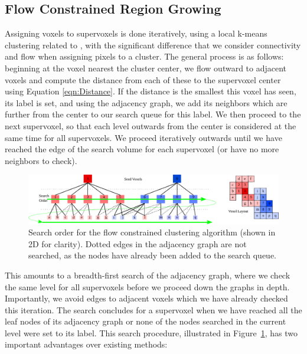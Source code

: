 \subsection{Flow Constrained Region Growing}
\label{subsec:FlowClustering}
Assigning voxels to supervoxels is done iteratively, using a local k-means clustering related to \cite{SLICCompared,DASP}, with the significant difference that we consider connectivity and flow when assigning pixels to a cluster. The general process is as follows: beginning at the voxel nearest the cluster center, we flow outward to adjacent voxels and compute the distance from each of these to the supervoxel center using Equation \ref{eqn:Distance}. If the distance is the smallest this voxel has seen, its label is set, and using the adjacency graph, we add its neighbors which are further from the center to our search queue for this label. We then proceed to the next supervoxel, so that each level outwards from the center is considered at the same time for all supervoxels. We proceed iteratively outwards until we have reached the edge of the search volume for each supervoxel (or have no more neighbors to check).

\begin{figure}[!t]
\begin{center}
   \includegraphics[width=0.95\linewidth]{figures/CVPR2013/SearchOrder.pdf}
\end{center}
   \caption[Voxel Search Order]{Search order for the flow constrained clustering algorithm (shown in 2D for clarity). Dotted edges in the adjacency graph are not searched, as the nodes have already been added to the search queue.}
\label{fig:ClusterSearch}
\end{figure}

This amounts to a breadth-first search of the adjacency graph, where we check the same level for all supervoxels before we proceed down the graphs in depth. Importantly, we avoid edges to adjacent voxels which we have already checked this iteration. The search concludes for a supervoxel when we have reached all the leaf nodes of its adjacency graph or none of the nodes searched in the current level were set to its label. This search procedure, illustrated in Figure~\ref{fig:ClusterSearch}, has two important advantages over existing methods:

